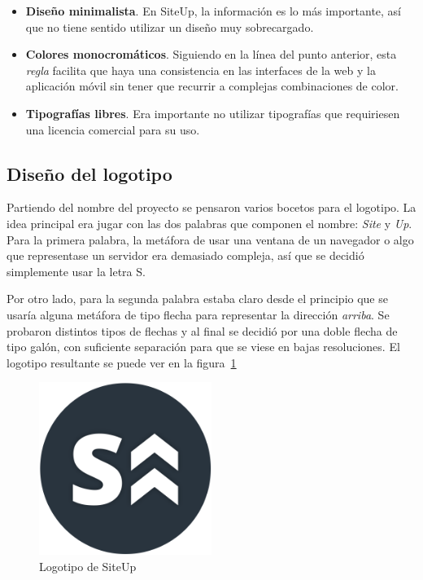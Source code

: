 \begin{itemize}
\item \textbf{Diseño minimalista}. En SiteUp, la información es lo más
  importante, así que no tiene sentido utilizar un diseño muy sobrecargado.
\item \textbf{Colores monocromáticos}. Siguiendo en la línea del punto anterior,
  esta \textit{regla} facilita que haya una consistencia en las interfaces de la
  web y la aplicación móvil sin tener que recurrir a complejas combinaciones de
  color.
\item \textbf{Tipografías libres}. Era importante no utilizar tipografías que
  requiriesen una licencia comercial para su uso.
\end{itemize}

\subsection{Diseño del logotipo}
\label{subsec:logotipo}

Partiendo del nombre del proyecto se pensaron varios bocetos para el
logotipo. La idea principal era jugar con las dos palabras que componen el
nombre: \textit{Site} y \textit{Up}. Para la primera palabra, la metáfora de
usar una ventana de un navegador o algo que representase un servidor era
demasiado compleja, así que se decidió simplemente usar la letra S. 

Por otro lado, para la segunda palabra estaba claro desde el principio que se
usaría alguna metáfora de tipo flecha para representar la dirección
\textit{arriba}. Se probaron distintos tipos de flechas y al final se decidió
por una doble flecha de tipo galón, con suficiente separación para que se viese
en bajas resoluciones. El logotipo resultante se puede ver en la
figura~\ref{fig:logotipo}

\begin{figure}[H]
  \centering
  \includegraphics[width=0.5\textwidth]{5_diseno/logo.png}
  \caption{Logotipo de SiteUp}
  \label{fig:logotipo}
\end{figure}

